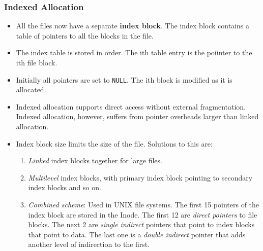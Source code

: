 \documentclass{article}
\theoremstyle{plain}
\theoremstyle{definition}
\begin{document}
\subsubsection{Indexed Allocation}
\begin{itemize}
    \item All the files now have a separate \textbf{index block}. The index block contains a table of pointers to all the blocks in the file.
    
    \item The index table is stored in order. The ith table entry is the poiinter to the ith file block. 
    
    \item Initially all pointers are set to \texttt{NULL}. The ith block is modified as it is allocated. 
    
    \item Indexed allocation supports direct access without external fragmentation. Indexed allocation, however, suffers from pointer overheads larger than linked allocation. 
    
    \item Index block size limits the size of the file. Solutions to this are:
    \begin{enumerate}
        \item \textit{Linked} index blocks together for large files.
        
        \item \textit{Multilevel} index blocks, with primary index block pointing to secondary index blocks and so on. 
        
        \item \textit{Combined scheme}: Used in UNIX file systems. The first 15 pointers of the index block are stored in the Inode. The first 12 are \textit{direct pointers} to file blocks. The next 2 are \textit{single indirect} pointers that point to index blocks that point to data. The last one is a \textit{double indirect} pointer that adds another level of indirection to the first. 
    \end{enumerate}
\end{itemize}
\end{document}
